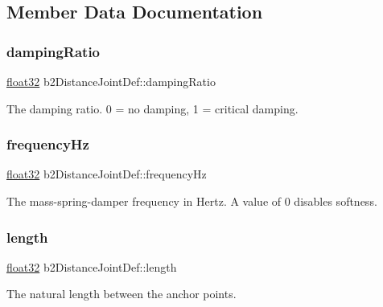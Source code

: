 \subsection{Member Data Documentation}
\mbox{\label{structb2_distance_joint_def_ad009b24ff211158eb4e1db4815a63b94}} 
\subsubsection{\texorpdfstring{dampingRatio}{dampingRatio}}
{\footnotesize\ttfamily \mbox{\hyperlink{b2_settings_8h_aacdc525d6f7bddb3ae95d5c311bd06a1}{float32}} b2\+Distance\+Joint\+Def\+::damping\+Ratio}



The damping ratio. 0 = no damping, 1 = critical damping. 

\mbox{\label{structb2_distance_joint_def_a35e2362bcb6c58734f95d0ac045863ea}} 
\subsubsection{\texorpdfstring{frequencyHz}{frequencyHz}}
{\footnotesize\ttfamily \mbox{\hyperlink{b2_settings_8h_aacdc525d6f7bddb3ae95d5c311bd06a1}{float32}} b2\+Distance\+Joint\+Def\+::frequency\+Hz}

The mass-\/spring-\/damper frequency in Hertz. A value of 0 disables softness. \mbox{\label{structb2_distance_joint_def_ac2c48ad52de91c804c386c12c5bf3714}} 
\subsubsection{\texorpdfstring{length}{length}}
{\footnotesize\ttfamily \mbox{\hyperlink{b2_settings_8h_aacdc525d6f7bddb3ae95d5c311bd06a1}{float32}} b2\+Distance\+Joint\+Def\+::length}



The natural length between the anchor points. 

